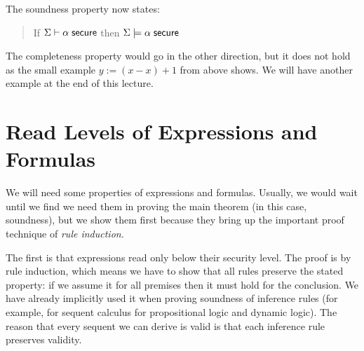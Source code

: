 \documentclass[11pt]{article}
\begin{document}
The soundness property now states:
\begin{quote}
  If $\Sigma \vdash \alpha\; \mathsf{secure}$ then $\Sigma \models \alpha\; \mathsf{secure}$
\end{quote}
The completeness property would go in the other direction, but it does not hold
as the small example $y := (x-x) + 1$ from above shows.  We will have another
example at the end of this lecture.

\section{Read Levels of Expressions and Formulas}

We will need some properties of expressions and formulas.  Usually, we would
wait until we find we need them in proving the main theorem (in this case,
soundness), but we show them first because they bring up the important proof
technique of \emph{rule induction}.

The first is that expressions read only below their security level.  The proof
is by rule induction, which means we have to show that all rules preserve the
stated property: if we assume it for all premises then it must hold for the
conclusion.  We have already implicitly used it when proving soundness of
inference rules (for example, for sequent calculus for propositional logic and
dynamic logic).  The reason that every sequent we can derive is valid is that
each inference rule preserves validity.
\end{document}
